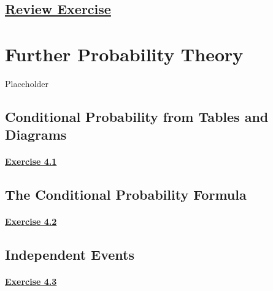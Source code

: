 \documentclass[
  11pt,
]{book}
\begin{document}
\section*{\texorpdfstring{\hyperref[re3a]{Review Exercise}}{Review Exercise}}\label{review-exercise-2}

\chapter{Further Probability Theory}\label{further-probability-theory}

Placeholder

\section{Conditional Probability from Tables and Diagrams}\label{conditional-probability-from-tables-and-diagrams}

\subsubsection*{\texorpdfstring{\hyperref[ex41a]{Exercise 4.1}}{Exercise 4.1}}\label{exercise-4.1}

\section{The Conditional Probability Formula}\label{the-conditional-probability-formula}

\subsubsection*{\texorpdfstring{\hyperref[ex42a]{Exercise 4.2}}{Exercise 4.2}}\label{exercise-4.2}

\section{Independent Events}\label{independent-events}

\subsubsection*{\texorpdfstring{\hyperref[ex43a]{Exercise 4.3}}{Exercise 4.3}}\label{exercise-4.3}
\end{document}
